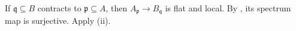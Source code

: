 If $\mathfrak{q}\subseteq B$ contracts to $\mathfrak{p}\subseteq A$, then $A_{\mathfrak{p}}\to B_{\mathfrak{q}}$ is flat and local. By , its spectrum map is surjective. Apply (ii).
